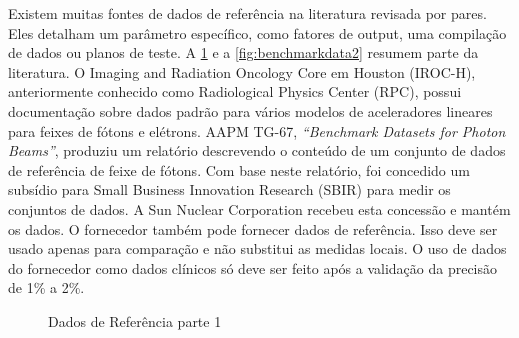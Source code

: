 \documentclass[11pt,a4paper]{article}
\begin{document}
	Existem muitas fontes de dados de referência na literatura revisada por pares. Eles detalham um parâmetro específico, como fatores de output, uma compilação de dados ou planos de teste. A \ref{fig:benchmarkdata1} e a \ref{fig:benchmarkdata2} resumem parte da literatura. O Imaging and Radiation Oncology Core em Houston (IROC-H), anteriormente conhecido como Radiological Physics Center (RPC), possui documentação sobre dados padrão para vários modelos de aceleradores lineares para feixes de fótons e elétrons. AAPM TG-67, \textit{``Benchmark Datasets for Photon Beams''}, produziu um relatório descrevendo o conteúdo de um conjunto de dados de referência de feixe de fótons. Com base neste relatório, foi concedido um subsídio para Small Business Innovation Research (SBIR) para medir os conjuntos de dados. A Sun Nuclear Corporation recebeu esta concessão e mantém os dados. O fornecedor também pode fornecer dados de referência. Isso deve ser usado apenas para comparação e não substitui as medidas locais. O uso de dados do fornecedor como dados clínicos só deve ser feito após a validação da precisão de 1\% a 2\%.

	\begin{figure}[!h]
		\centering
		\caption{Dados de Referência parte 1}
		\label{fig:benchmarkdata1}
	\end{figure}
\end{document}
